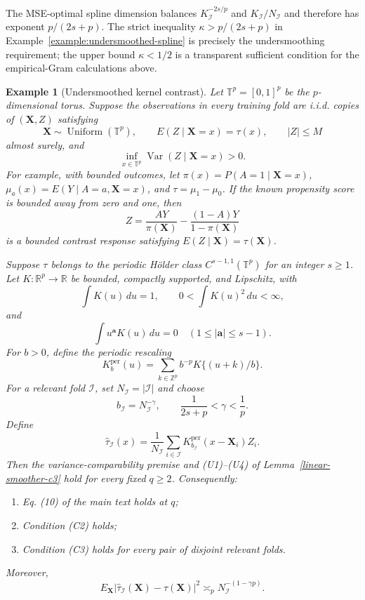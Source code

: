 \documentclass[11pt]{article}
\theoremstyle{referenceplain}
\theoremstyle{referencedefinition}
\newtheorem{example}{Example}
\theoremstyle{referenceremark}
\begin{document}
The MSE-optimal spline dimension balances
$K_{\mathcal I}^{-2s/p}$ and $K_{\mathcal I}/N_{\mathcal I}$ and therefore has exponent $p/(2s+p)$. The strict inequality
$\kappa>p/(2s+p)$ in Example~\ref{example:undersmoothed-spline} is precisely the undersmoothing requirement; the upper bound $\kappa<1/2$ is a transparent sufficient condition for the empirical-Gram calculations above.

\begin{example}[Undersmoothed kernel contrast]
\label{example:undersmoothed-kernel}
Let $\mathbb T^p=[0,1]^p$ be the $p$-dimensional torus. Suppose the observations in every training fold are i.i.d. copies of $(\mathbf X,Z)$ satisfying
\[
\mathbf X\sim\operatorname{Uniform}(\mathbb T^p),
\qquad
E(Z\mid\mathbf X=x)=\tau(x),
\qquad
|Z|\le M
\]
almost surely, and
\[
\inf_{x\in\mathbb T^p}\operatorname{Var}(Z\mid\mathbf X=x)>0.
\]
For example, with bounded outcomes, let
$\pi(x)=P(A=1\mid\mathbf X=x)$,
$\mu_a(x)=E(Y\mid A=a,\mathbf X=x)$, and
$\tau=\mu_1-\mu_0$. If the known propensity score is bounded away from zero and one, then
\[
Z=\frac{AY}{\pi(\mathbf X)}-
\frac{(1-A)Y}{1-\pi(\mathbf X)}
\]
is a bounded contrast response satisfying $E(Z\mid\mathbf X)=\tau(\mathbf X)$.

Suppose $\tau$ belongs to the periodic H\"older class
$C^{s-1,1}(\mathbb T^p)$ for an integer $s\ge1$. Let
$K:\mathbb R^p\to\mathbb R$ be bounded, compactly supported, and Lipschitz, with
\[
\int K(u)\,du=1,
\qquad
0<\int K(u)^2\,du<\infty,
\]
and
\[
\int u^{\boldsymbol a}K(u)\,du=0
\quad(1\le|\boldsymbol a|\le s-1).
\]
For $b>0$, define the periodic rescaling
\[
K_b^{\mathrm{per}}(u)
=\sum_{k\in\mathbb Z^p}b^{-p}K\{(u+k)/b\}.
\]
For a relevant fold $\mathcal I$, set $N_{\mathcal I}=|\mathcal I|$ and choose
\[
b_{\mathcal I}=N_{\mathcal I}^{-\gamma},
\qquad
\frac1{2s+p}<\gamma<\frac1p.
\]
Define
\[
\widehat\tau_{\mathcal I}(x)
=\frac1{N_{\mathcal I}}
\sum_{i\in\mathcal I}K_{b_{\mathcal I}}^{\mathrm{per}}(x-\mathbf X_i)Z_i.
\]
Then the variance-comparability premise and (U1)--(U4) of
Lemma~\ref{linear-smoother-c3} hold for every fixed $q\ge2$. Consequently:
\begin{enumerate}
\item[\textup{(a)}] Eq. (10) of the main text holds at $q$;
\item[\textup{(b)}] Condition (C2) holds;
\item[\textup{(c)}] Condition (C3) holds for every pair of disjoint relevant folds.
\end{enumerate}
Moreover,
\[
E_{\mathbf X}|\widehat\tau_{\mathcal I}(\mathbf X)-\tau(\mathbf X)|^2
\asymp_p N_{\mathcal I}^{-(1-\gamma p)}.
\]
\end{example}
\end{document}
